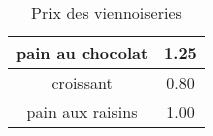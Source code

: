 \documentclass[10pt,a4paper]{article}
\begin{document}
\begin{table}
\centering
\begin{tabular}{ | c | c !{\euro{}} |}
\hline
pain au chocolat & 1.25\\
\hline  
croissant& 0.80\\
\hline  
pain aux raisins& 1.00\\
\hline  
\end{tabular}
\label{tab:prix}
\caption{Prix des viennoiseries}
\end{table} 
\end{document}
